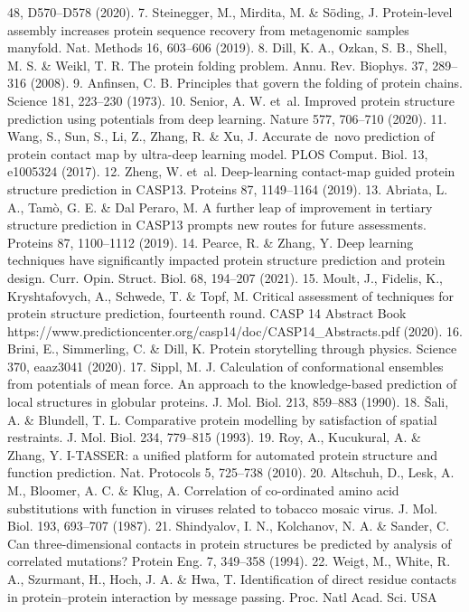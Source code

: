 48, D570–D578 (2020).
7.
Steinegger, M., Mirdita, M. \& Söding, J. Protein-level assembly increases protein sequence
recovery from metagenomic samples manyfold. Nat. Methods 16, 603–606 (2019).
8.
Dill, K. A., Ozkan, S. B., Shell, M. S. \& Weikl, T. R. The protein folding problem. Annu. Rev.
Biophys. 37, 289–316 (2008).
9.
Anfinsen, C. B. Principles that govern the folding of protein chains. Science 181, 223–230
(1973).
10.
Senior, A. W. et al. Improved protein structure prediction using potentials from deep
learning. Nature 577, 706–710 (2020).
11.
Wang, S., Sun, S., Li, Z., Zhang, R. \& Xu, J. Accurate de novo prediction of protein contact
map by ultra-deep learning model. PLOS Comput. Biol. 13, e1005324 (2017).
12.
Zheng, W. et al. Deep-learning contact-map guided protein structure prediction in
CASP13. Proteins 87, 1149–1164 (2019).
13.
Abriata, L. A., Tamò, G. E. \& Dal Peraro, M. A further leap of improvement in tertiary
structure prediction in CASP13 prompts new routes for future assessments. Proteins 87,
1100–1112 (2019).
14.
Pearce, R. \& Zhang, Y. Deep learning techniques have significantly impacted protein
structure prediction and protein design. Curr. Opin. Struct. Biol. 68, 194–207 (2021).
15.
Moult, J., Fidelis, K., Kryshtafovych, A., Schwede, T. \& Topf, M. Critical assessment of
techniques for protein structure prediction, fourteenth round. CASP 14 Abstract Book
https://www.predictioncenter.org/casp14/doc/CASP14\_Abstracts.pdf (2020).
16.
Brini, E., Simmerling, C. \& Dill, K. Protein storytelling through physics. Science 370,
eaaz3041 (2020).
17.
Sippl, M. J. Calculation of conformational ensembles from potentials of mean force.
An approach to the knowledge-based prediction of local structures in globular proteins.
J. Mol. Biol. 213, 859–883 (1990).
18.
Šali, A. \& Blundell, T. L. Comparative protein modelling by satisfaction of spatial
restraints. J. Mol. Biol. 234, 779–815 (1993).
19.
Roy, A., Kucukural, A. \& Zhang, Y. I-TASSER: a unified platform for automated protein
structure and function prediction. Nat. Protocols 5, 725–738 (2010).
20.	 Altschuh, D., Lesk, A. M., Bloomer, A. C. \& Klug, A. Correlation of co-ordinated amino acid
substitutions with function in viruses related to tobacco mosaic virus. J. Mol. Biol. 193,
693–707 (1987).
21.
Shindyalov, I. N., Kolchanov, N. A. \& Sander, C. Can three-dimensional contacts in protein
structures be predicted by analysis of correlated mutations? Protein Eng. 7, 349–358 (1994).
22.	 Weigt, M., White, R. A., Szurmant, H., Hoch, J. A. \& Hwa, T. Identification of direct residue
contacts in protein–protein interaction by message passing. Proc. Natl Acad. Sci. USA
